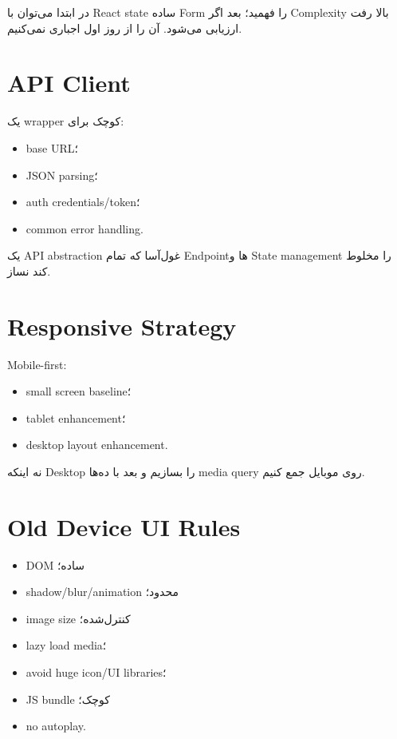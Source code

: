 در ابتدا می‌توان با React state ساده Form را فهمید؛ بعد اگر Complexity بالا رفت  ارزیابی می‌شود. آن را از روز اول اجباری نمی‌کنیم.

\section{API Client}

یک wrapper کوچک برای:
\begin{itemize}
  \item base URL؛
  \item JSON parsing؛
  \item auth credentials/token؛
  \item common error handling.
\end{itemize}

\begin{warningbox}
یک API abstraction غول‌آسا که تمام Endpointها و State management را مخلوط کند نساز.
\end{warningbox}

\section{Responsive Strategy}

Mobile-first:
\begin{itemize}
  \item small screen baseline؛
  \item tablet enhancement؛
  \item desktop layout enhancement.
\end{itemize}

نه اینکه Desktop را بسازیم و بعد با ده‌ها media query روی موبایل جمع کنیم.

\section{Old Device UI Rules}

\begin{itemize}
  \item DOM ساده؛
  \item shadow/blur/animation محدود؛
  \item image size کنترل‌شده؛
  \item lazy load media؛
  \item avoid huge icon/UI libraries؛
  \item JS bundle کوچک؛
  \item no autoplay.
\end{itemize}

